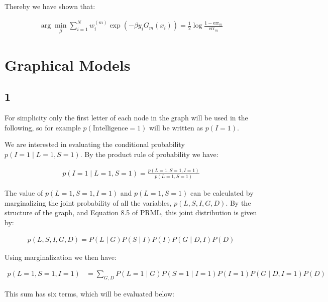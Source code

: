 \documentclass[a4paper, 12pt]{article}
\begin{document}
Thereby we have shown that:

\begin{align}
	\arg \min_{\beta} \sum_{i=1}^N w_i^{(m)} \exp(-\beta y_i G_m(x_i)) = \frac{1}{2} \log \frac{1 - \text{err}_m}{\text{err}_m}
\end{align}


\section{Graphical Models}

\subsection{1}
For simplicity only the first letter of each node in the graph will be used in the following, so for example $p(\text{Intelligence} = 1)$ will be written as $p(I=1)$.

We are interested in evaluating the conditional probability $p(I=1 \mid L=1, S = 1)$. By the product rule of probability we have:

\begin{align}
	p(I=1 \mid L=1, S = 1) = \frac{p(L=1, S=1, I=1)}{p(L=1, S=1)}
\end{align}

The value of $p(L=1, S=1, I=1)$ and $p(L=1, S=1)$ can be calculated by marginalizing the joint probability of all the variables, $p(L, S, I, G, D)$. By the structure of the graph, and Equation 8.5 of PRML, this joint distribution is given by:

\begin{align}
	p(L, S, I, G, D) = P(L \mid G)P(S \mid I)P(I)P(G \mid D,I)P(D)
\end{align}

Using marginalization we then have:

\begin{align}
	p(L=1, S=1, I=1) &= \sum_{G, D} P(L=1 \mid G)P(S=1 \mid I=1)P(I=1)P(G \mid D,I=1)P(D)
\end{align}

This sum has six terms, which will be evaluated below:
\end{document}
